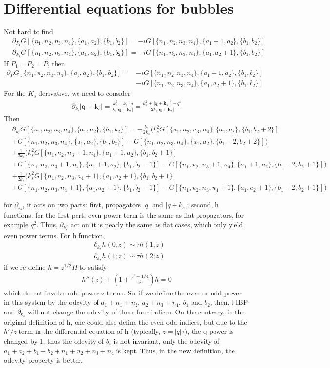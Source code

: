 \documentclass[a4paper,12pt]{article}
\newcommand{\n}{\nonumber}
\def\ie{\begin{equation}\begin{aligned}}
\def\fe{\end{aligned}\end{equation}}
\begin{document}
\section{Differential equations for bubbles}
Not hard to find
\ie
&\partial_{P_1}G[\{n_1,n_2,n_3,n_4\},\{a_1,a_2\},\{b_1,b_2\}]=-iG[\{n_1,n_2,n_3,n_4\},\{a_1+1,a_2\},\{b_1,b_2\}]  \\
&\partial_{P_2}G[\{n_1,n_2,n_3,n_4\},\{a_1,a_2\},\{b_1,b_2\}]=-iG[\{n_1,n_2,n_3,n_4\},\{a_1,a_2+1\},\{b_1,b_2\}] 
\fe
If $P_1=P_2=P$, then
\ie
\partial_{P}G[\{n_1,n_2,n_3,n_4\},\{a_1,a_2\},\{b_1,b_2\}]=&-iG[\{n_1,n_2,n_3,n_4\},\{a_1+1,a_2\},\{b_1,b_2\}]\\
&-iG[\{n_1,n_2,n_3,n_4\},\{a_1,a_2+1\},\{b_1,b_2\}]  
\fe
For the $K_s$ derivative, we need to consider
\ie
\partial_{k_s}|\bm q+\bm k_s|=\frac{k_s^2+k_s\cdot q}{k_s|\bm q+\bm k_s|}=\frac{k_s^2+|\bm q+\bm k_s|^2-q^2}{2k_s|\bm q+\bm k_s|}
\fe
Then
\ie
&\partial_{k_s}G[\{n_1,n_2,n_3,n_4\},\{a_1,a_2\},\{b_1,b_2\}]= - \frac{b_2}{2k_s}\bigg(k_s^2G[\{n_1,n_2,n_3,n_4\},\{a_1,a_2\},\{b_1,b_2+2\}]\\
&+G[\{n_1,n_2,n_3,n_4\},\{a_1,a_2\},\{b_1,b_2\}]-G[\{n_1,n_2,n_3,n_4\},\{a_1,a_2\},\{b_1-2,b_2+2\}]\bigg)\\
&+\frac{1}{2k_s}\bigg(k_s^2G[\{n_1,n_2,n_3+1,n_4\},\{a_1+1,a_2\},\{b_1,b_2+1\}]\\
&+G[\{n_1,n_2,n_3+1,n_4\},\{a_1+1,a_2\},\{b_1,b_2-1\}]-G[\{n_1,n_2,n_3+1,n_4\},\{a_1+1,a_2\},\{b_1-2,b_2+1\}]\bigg)\\
&+\frac{1}{2k_s}\bigg(k_s^2G[\{n_1,n_2,n_3,n_4+1\},\{a_1,a_2+1\},\{b_1,b_2+1\}]\\
&+G[\{n_1,n_2,n_3,n_4+1\},\{a_1,a_2+1\},\{b_1,b_2-1\}]-G[\{n_1,n_2,n_3,n_4+1\},\{a_1,a_2+1\},\{b_1-2,b_2+1\}]\bigg)
\fe

for $\partial_{k_s}$, it acts on two parts: first, propagators $|q|$ and $|q+k_s|$; second, h functions.
for the first part, even power term is the same as flat propagators, for example $q^2$. Thus, $\partial_{k_s^2}$ act on it is nearly the same as flat cases, which only yield even power terms. For
h function, 
\ie
&  \partial_{k_s}h(0;z)\sim \tau h(1;z)\n\\
&  \partial_{k_s}h(1;z)\sim \tau h(2;z)
\fe
if we re-define $h=z^{1/2} H$ to satisfy
\ie
h''(z)+  \left(1+\frac{v^2-1/4}{z^2}\right) h = 0
\fe
which do not involve odd power z terms.
So, if we define the even or odd power in this system by the odevity of $a_1+n_1+n_2$, $a_2+n_3+n_4$, $b_1$ and $b_2$, then, l-IBP and $\partial_{k_s}$ will not change the odevity of these four indices. On the contrary, in the original definition of h, one could also define the even-odd indices, but due to the $h'/z$ term in the differential equation of h (typically, $z=|q|\tau$), the q power is changed by 1, thus the odevity of $b_i$ is not invariant, only the odevity of $a_1+a_2+b_1+b_2+n_1+n_2+n_3+n_4$ is kept. Thus, in the new definition, the odevity property is better.
\end{document}
